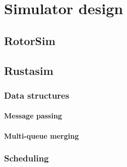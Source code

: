\chapter{Simulator design}

\section{RotorSim}

\section{Rustasim}
\subsection{Data structures}
\subsubsection{Message passing}

\subsubsection{Multi-queue merging}

\subsection{Scheduling}